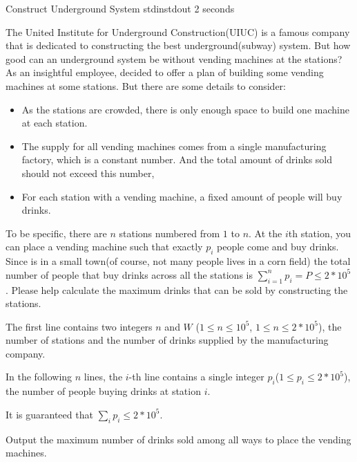 \begin{problem}{Construct Underground System}
{stdin}{stdout}
{2 seconds}{}{}

The United Institute for Underground Construction(UIUC) is a famous company that is dedicated to constructing the best underground(subway) system. But how good can an underground system be without vending machines at the stations? As an insightful employee, \pittoresque decided to offer a plan of building some vending machines at some stations. But there are some details to consider:
\begin{itemize}
    \item As the stations are crowded, there is only enough space to build one machine at each station.
    \item The supply for all vending machines comes from a single manufacturing factory, which is a constant number. And the total amount of drinks sold should not exceed this number,
    \item For each station with a vending machine, a fixed amount of people will buy drinks. 
\end{itemize}

To be specific, there are $n$ stations numbered from $1$ to $n$. At the $i$th station, you can place a vending machine such that exactly $p_i$ people come and buy drinks. Since \pittoresque is in a small town(of course, not many people lives in a corn field) the total number of people that buy drinks across all the stations is $\sum_{i=1}^n p_i = P \leq 2 * 10^5$. Please help \pittoresque calculate the maximum drinks that can be sold by constructing the stations. 

\InputFile

The first line contains two integers $n$ and $W$ ($1 \le n \le 10^5$, $1 \le n \le 2 * 10^5$), the number of stations and the number of  drinks supplied by the manufacturing company.

In the following $n$ lines, the $i$-th line contains a single integer $p_i$($1 \le p_i \le 2 * 10^5$), the number of people buying drinks at station $i$.

It is guaranteed that $\sum_i p_i \leq 2 * 10^5$.

\OutputFile

Output the maximum number of drinks sold among all ways to place the vending machines.

\Examples

\begin{example}
%
\end{example}

\begin{example}
%
\end{example}



\end{problem}
